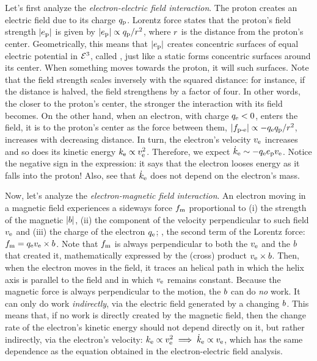 Let's first analyze the \emph{electron-electric field interaction}. The proton creates an electric field due to its charge $q_\text{p}$. Lorentz force states that the proton's field strength $\vert{e_\text{p}}\vert$ is given by $\vert{e_\text{p}}\vert\propto q_\text{p}/r^2$, where $r$ is the distance from the proton's center. Geometrically, this means that $\vert{e_\text{p}}\vert$ creates concentric surfaces of equal electric potential in $\mathcal{E}^{3}$, called , just like a static  forms concentric  surfaces around its center. When something moves towards the proton, it will  such surfaces. Note that the field strength scales inversely with the squared distance: for instance, if the distance is halved, the field strengthens by a factor of four. In other words, the closer to the proton's center, the stronger the interaction with its field becomes. On the other hand, when an electron, with charge $q_\text{e} < 0$, enters the field, it is  to the proton's center as the force between them, $\vert{f_\text{p-e}}\vert\propto -q_\text{e}q_\text{p}/r^2$, increases with decreasing distance. In turn, the electron's velocity $v_\text{e}$ increases and so does its kinetic energy $k_\text{e}\propto v_\text{e}^2$. Therefore, we expect $\dot{k}_\text{e}\sim-q_\text{e}e_\text{p}v_\text{e}$. Notice the negative sign in the expression: it says that the electron looses energy as it falls into the proton! Also, see that $\dot{k}_\text{e}$ does not depend on the electron's mass.

Now, let's analyze the \emph{electron-magnetic field interaction}. An electron moving in a magnetic field experiences a sideways force $f_\text{m}$ proportional to (i) the strength of the magnetic  $\vert{b}\vert$, (ii) the component of the velocity perpendicular to such field $v_\text{e}$ and (iii) the charge of the electron $q_\text{e}$; \ie, the second term of the Lorentz force: $f_\text{m} = q_\text{e}v_\text{e}\times b$. Note that $f_\text{m}$ is always perpendicular to both the $v_\text{e}$ and the $b$ that created it, mathematically expressed by the (cross) product $v_\text{e}\times b$. Then, when the electron moves in the field, it traces an helical path in which the helix axis is parallel to the field and in which $v_\text{e}$ remains constant. Because the magnetic force is always perpendicular to the motion, the $b$ can do \emph{no} work. It can only do work \emph{indirectly}, via the electric field generated by a changing $b$. This means that, if no work is directly created by the magnetic field, then the change rate of the electron's kinetic energy should not depend directly on it, but rather indirectly, via the electron's velocity: $k_\text{e}\propto v_\text{e}^2\implies\dot{k}_\text{e}\propto v_\text{e}$, which has the same dependence as the equation obtained in the electron-electric field analysis.

